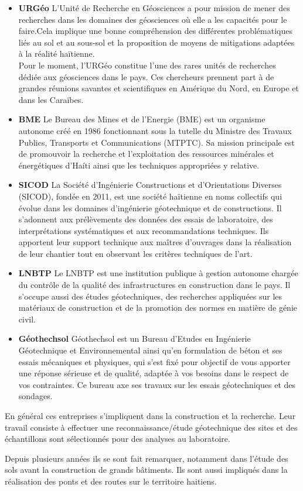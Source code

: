 \begin{itemize}
    \item \textbf{URGéo}
    L'Unité de Recherche en Géosciences a pour mission de mener des
    recherches dans les domaines des géosciences où elle a les capacités
    pour le faire.Cela implique une bonne compréhension des différentes 
    problématiques liés au sol et au sous-sol et la proposition de moyens
    de mitigations adaptées à la réalité haïtienne.
    \cite{mission_urgeo}
    \\
    Pour le moment, l’URGéo constitue l’une des rares unités de recherches
    dédiée aux géosciences dans le pays. Ces chercheurs prennent part à de
    grandes réunions savantes et scientifiques en Amérique du Nord, en 
    Europe et dans les Caraïbes.
    \item \textbf{BME}
    Le Bureau des Mines et de l’Energie (BME) est un organisme autonome créé en 
    1986 fonctionnant sous la tutelle du Ministre des Travaux Publics, Transports 
    et Communications (MTPTC). Sa mission principale est de promouvoir la recherche
    et l'exploitation des ressources minérales et énergétiques d'Haíti ainsi que les 
    techniques appropriées y relative.
    \item \textbf{SICOD}
    La  Société d’Ingénierie Constructions et d’Orientations Diverses (SICOD),
    fondée en 2011, est une société haïtienne en noms collectifs qui évolue dans 
    les domaines d’ingénierie géotechnique et de constructions.
    Il s'adonnent aux prélèvements des données des essais de laboratoire, des 
    interprétations systématiques et aux recommandations techniques. 
    Ils apportent leur support technique aux maîtres d'ouvrages dans la réalisation 
    de leur chantier tout en observant les critères techniques de l'art.
    \item \textbf{LNBTP}
    Le LNBTP est une institution publique à gestion autonome chargée du contrôle de
    la qualité des infrastructures en construction dans le pays. Il s'occupe 
    aussi des études géotechniques, des recherches appliquées sur les matériaux de 
    construction et de la promotion des normes en matière de génie civil.
    \item \textbf{Géothechsol}
    Géothechsol est un Bureau d’Etudes en Ingénierie Géo\-technique et Environnemental
    ainsi qu’en formulation de béton et ses essais mécaniques et physiques, qui s’est
    fixé pour objectif de vous apporter une réponse sérieuse et de qualité, adaptée à 
    vos besoins dans le respect de vos contraintes. Ce bureau axe ses travaux sur les
     essais géotechniques et des sondages.
\end{itemize}   

\par
En général ces entreprises s'impliquent dans la construction et la recherche. 
Leur travail consiste à effectuer une reconnaissance/étude géotechnique des sites et
des échantillons  sont sélectionnés pour des analyses au laboratoire.
\par
Depuis plusieurs années ils se sont fait remarquer, notamment dans
l'étude des sols avant la construction de grands bâtiments. Ils sont aussi impliqués
dans la réalisation des ponts et des routes sur le territoire
haitiens. 